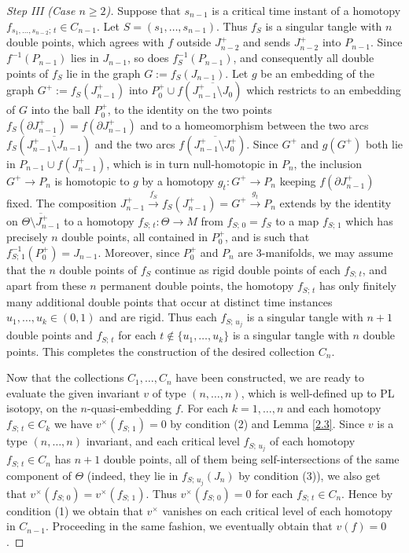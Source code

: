 \documentclass[a4paper,12pt,reqno,oneside]{amsart} %
\theoremstyle{plain}
\theoremstyle{definition}
\theoremstyle{named}
\def\x{\times}
\def\but{\setminus}
\renewcommand{\:}{\colon}
\def\xr#1{\xrightarrow{#1}}
\begin{document}
\begin{proof}[Step III (Case $n\ge 2$)]
Suppose that $s_{n-1}$ is a critical time instant of a homotopy $f_{s_1,\dots,s_{n-2};\,t}\in C_{n-1}$.
Let $S=(s_1,\dots,s_{n-1})$.
Thus $f_S$ is a singular tangle with $n$ double points, which agrees with $f$ outside $J_{n-2}^+$ and 
sends $J_{n-2}^+$ into $P_{n-1}$.
Since $f^{-1}(P_{n-1})$ lies in $J_{n-1}$, so does $f_S^{-1}(P_{n-1})$, and consequently
all double points of $f_S$ lie in the graph $G:=f_S(J_{n-1})$.
Let $g$ be an embedding of the graph $G^+:=f_S(J_{n-1}^+)$ into $P_0^+\cup f(\overline{J_{n-1}^+\but J_0})$
which restricts to an embedding of $G$ into the ball $P_0^+$, to the identity on 
the two points $f_S(\partial J_{n-1}^+)=f(\partial J_{n-1}^+)$ and to a homeomorphism between 
the two arcs $f_S(\overline{J_{n-1}^+\but J_{n-1}})$ and the two arcs $f(\overline{J_{n-1}^+\but J_0^+})$.
Since $G^+$ and $g(G^+)$ both lie in $P_{n-1}\cup f(J_{n-1}^+)$, which is in turn null-homotopic in $P_n$,
the inclusion $G^+\to P_n$ is homotopic to $g$ by a homotopy $g_t\:G^+\to P_n$ keeping $f(\partial J_{n-1}^+)$ fixed.
The composition $J_{n-1}^+\xr{f_S}f_S(J_{n-1}^+)=G^+\xr{g_t}P_n$ extends by the identity 
on $\overline{\Theta\but J_{n-1}^+}$ to a homotopy $f_{S;\,t}\:\Theta\to M$ from $f_{S;\,0}=f_S$ to a map $f_{S;\,1}$ 
which has precisely $n$ double points, all contained in $P_0^+$, and is such that $f_{S;\,1}^{-1}(P_0^+)=J_{n-1}$.
Moreover, since $P_0^+$ and $P_n$ are $3$-manifolds, we may assume that the $n$ double points of $f_S$ 
continue as rigid double points of each $f_{S;\,t}$, and apart from these $n$ permanent double points, the homotopy 
$f_{S;\,t}$ has only finitely many additional double points that occur at distinct time instances 
$u_1,\dots,u_k\in (0,1)$ and are rigid.
Thus each $f_{S;\,u_j}$ is a singular tangle with $n+1$ double points and $f_{S;\,t}$ for each 
$t\notin\{u_1,\dots,u_k\}$ is a singular tangle with $n$ double points.
This completes the construction of the desired collection $C_n$.

Now that the collections $C_1,\dots,C_n$ have been constructed, we are ready to evaluate the given invariant $v$
of type $(n,\dots,n)$, which is well-defined up to PL isotopy, on the $n$-quasi-embedding $f$.
For each $k=1,\dots,n$ and each homotopy $f_{S;\,t}\in C_k$ we have $v^\x(f_{S;\,1})=0$ by condition (2)
and Lemma \ref{2.3}.
Since $v$ is a type $(n,\dots,n)$ invariant, and each critical level $f_{S;\,u_j}$ of each homotopy $f_{S;\,t}\in C_n$
has $n+1$ double points, all of them being self-intersections of the same component of $\Theta$ (indeed, they lie
in $f_{S;\,u_j}(J_n)$ by condition (3)), we also get that $v^\x(f_{S;\,0})=v^\x(f_{S;\,1})$.
Thus $v^\x(f_{S;\,0})=0$ for each $f_{S;\,t}\in C_n$.
Hence by condition (1) we obtain that $v^\x$ vanishes on each critical level of each homotopy in $C_{n-1}$.
Proceeding in the same fashion, we eventually obtain that $v(f)=0$.
\end{proof}
\end{document}
